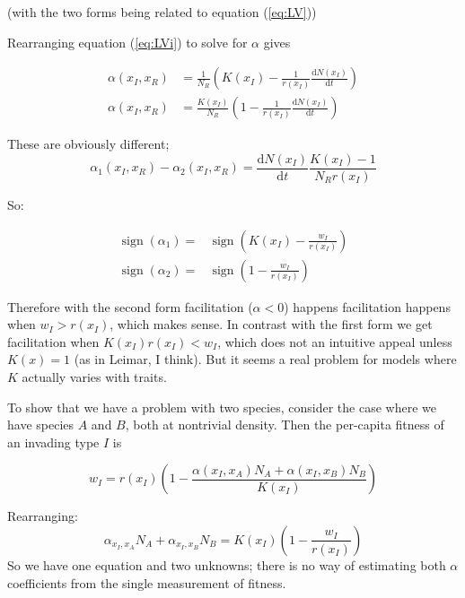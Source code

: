 \documentclass[a4paper,11pt]{article}
\newcommand{\ud}{\ensuremath{\mathrm{d}}}
\newcommand{\sign}{\mathop{\mathrm{sign}}\nolimits}
\begin{document}
(with the two forms being related to equation (\ref{eq:LV}))

Rearranging equation (\ref{eq:LVi}) to solve for $\alpha$ gives

\begin{subequations}
  \begin{align}
    \alpha(x_I, x_R) &= \frac{1}{N_R}
    \left(K(x_I) - \frac{1}{r(x_I)}\frac{\ud N(x_I)}{\ud t}\right)\\
    \alpha(x_I, x_R) &= \frac{K(x_I)}{N_R}
    \left(1 - \frac{1}{r(x_I)}\frac{\ud N(x_I)}{\ud t}\right)
  \end{align}
\end{subequations}

These are obviously different;
\begin{equation*}
  \alpha_1(x_I, x_R) - \alpha_2(x_I, x_R) =
  \frac{\ud N(x_I)}{\ud t} \frac{K(x_I) - 1}{N_R r(x_I)}
\end{equation*}

So:

\begin{align*}
  \sign(\alpha_1) =& \sign\left(K(x_I) - \frac{w_I}{r(x_I)}\right)\\
  \sign(\alpha_2) =& \sign\left(1 - \frac{w_I}{r(x_I)}\right)
\end{align*}

Therefore with the second form facilitation ($\alpha < 0$) happens
facilitation happens when $w_I > r(x_I)$, which makes sense.  In
contrast with the first form we get facilitation when $K(x_I) r(x_I) <
w_I$, which does not an intuitive appeal unless $K(x) = 1$ (as in
Leimar, I think).  But it seems a real problem for models where $K$
actually varies with traits.

To show that we have a problem with two species, consider the case
where we have species $A$ and $B$, both at nontrivial density.  Then
the per-capita fitness of an invading type $I$ is

\begin{equation*}
  w_I = r(x_I)\left(1 - \frac{\alpha(x_I, x_A) N_A + \alpha(x_I, x_B) N_B}{K(x_I)}\right)
\end{equation*}

Rearranging:
\begin{equation*}
  \alpha_{x_I, x_A} N_A + \alpha_{x_I, x_B} N_B =
  K(x_I)\left(1 - \frac{w_I}{r(x_I)}\right)
\end{equation*}
So we have one equation and two unknowns; there is no way of
estimating both $\alpha$ coefficients from the single measurement of
fitness.
\end{document}
